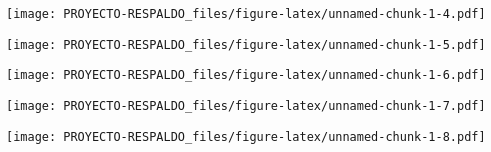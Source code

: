 \documentclass[
]{article}
\newenvironment{Shaded}{\begin{snugshade}}{\end{snugshade}}
\newcommand{\DataTypeTok}[1]{\textcolor[rgb]{0.13,0.29,0.53}{#1}}
\newcommand{\KeywordTok}[1]{\textcolor[rgb]{0.13,0.29,0.53}{\textbf{#1}}}
\newcommand{\NormalTok}[1]{#1}
\newcommand{\OperatorTok}[1]{\textcolor[rgb]{0.81,0.36,0.00}{\textbf{#1}}}
\newcommand{\StringTok}[1]{\textcolor[rgb]{0.31,0.60,0.02}{#1}}
\begin{document}
\begin{Shaded}
\end{Shaded}

\texttt{[image: PROYECTO-RESPALDO\_files/figure-latex/unnamed-chunk-1-4.pdf]}

\begin{Shaded}
\end{Shaded}

\texttt{[image: PROYECTO-RESPALDO\_files/figure-latex/unnamed-chunk-1-5.pdf]}

\begin{Shaded}
\end{Shaded}

\texttt{[image: PROYECTO-RESPALDO\_files/figure-latex/unnamed-chunk-1-6.pdf]}

\begin{Shaded}
\end{Shaded}

\texttt{[image: PROYECTO-RESPALDO\_files/figure-latex/unnamed-chunk-1-7.pdf]}

\begin{Shaded}
\end{Shaded}

\texttt{[image: PROYECTO-RESPALDO\_files/figure-latex/unnamed-chunk-1-8.pdf]}

\begin{Shaded}
\end{Shaded}
\end{document}
